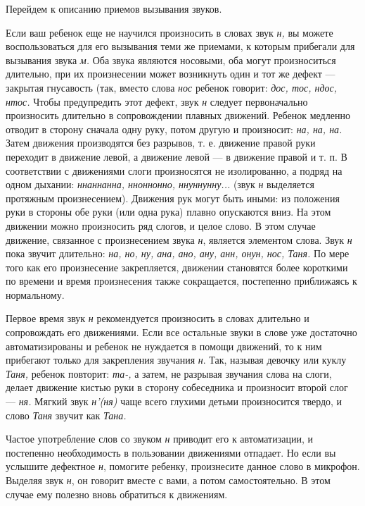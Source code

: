 \documentclass[a5paper]{book}
\renewcommand{\emph}[1]{\textit{#1}}
\begin{document}
Перейдем к описанию приемов вызывания звуков.

Если ваш ребенок еще не научился произносить в словах звук \emph{н,} вы
можете воспользоваться для его вызывания теми же приемами, к которым
прибегали для вызывания звука \emph{м.} Оба звука являются носовыми, оба
могут произноситься длительно, при их произнесении может возникнуть один
и тот же дефект --- закрытая гнусавость (так, вместо слова \emph{нос}
ребенок говорит: \emph{дос, тос, ндос, нтос.} Чтобы предупредить этот
дефект, звук \emph{н} следует первоначально произносить длительно в
сопровождении плавных движений. Ребенок медленно отводит в сторону
сначала одну руку, потом другую и произносит: \emph{на, на, на.} Затем
движения производятся без разрывов, т. е. движение правой руки переходит
в движение левой, а движение левой --- в движение правой и т. п. В
соответствии с движениями слоги произносятся не изолированно, а подряд
на одном дыхании: \emph{ннаннанна, нноннонно, ннуннунну...} (звук
\emph{н} выделяется протяжным произнесением). Движения рук могут быть
иными: из положения руки в стороны обе руки (или одна рука) плавно
опускаются вниз. На этом движении можно произносить ряд слогов, и целое
слово. В этом случае движение, связанное с произнесением звука \emph{н},
является элементом слова. Звук \emph{н} пока звучит длительно: \emph{на,
но, ну, ана, ано, ану, анн, онун, нос, Таня.} По мере того как его
произнесение закрепляется, движении становятся более короткими по
времени и время произнесения также сокращается, постепенно приближаясь к
нормальному.

Первое время звук \emph{н} рекомендуется произносить в словах длительно
и сопровождать его движениями. Если все остальные звуки в слове уже
достаточно автоматизированы и ребенок не нуждается в помощи движений, то
к ним прибегают только для закрепления звучания \emph{н}. Так, называя
девочку или куклу \emph{Таня,} ребенок повторит: \emph{та-,} а затем, не
разрывая звучания слова на слоги, делает движение кистью руки в сторону
собеседника и произносит второй слог --- \emph{ня.} Мягкий звук
\emph{н'(ня)} чаще всего глухими детьми произносится твердо, и слово
\emph{Таня} звучит как \emph{Тана.}

Частое употребление слов со звуком \emph{н} приводит его к
автоматизации, и постепенно необходимость в пользовании движениями
отпадает. Но если вы услышите дефектное \emph{н}, помогите ребенку,
произнесите данное слово в микрофон. Выделяя звук \emph{н}, он говорит
вместе с вами, а потом самостоятельно. В этом случае ему полезно вновь
обратиться к движениям.
\end{document}
